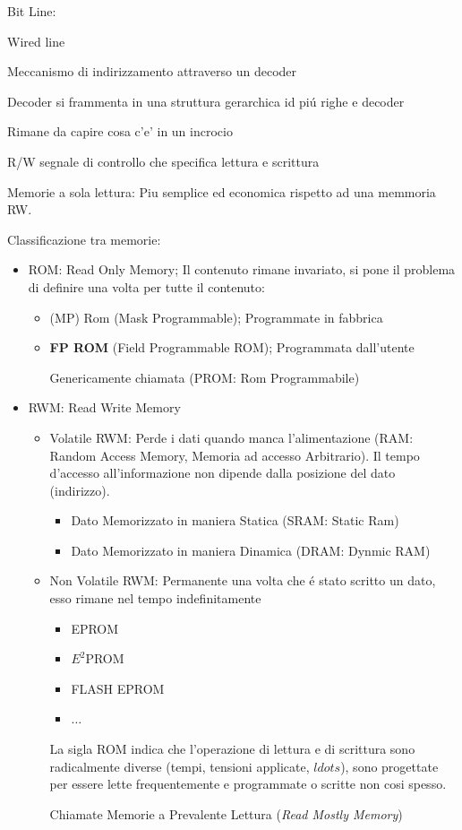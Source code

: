 \documentclass{article}
\begin{document}
Bit Line:

Wired line

Meccanismo di indirizzamento attraverso un decoder

Decoder si frammenta in una struttura gerarchica id pi\'u righe e decoder

Rimane da capire cosa c'e' in un incrocio

%

R/W segnale di controllo che specifica lettura e scrittura

Memorie a sola lettura: Piu semplice ed economica rispetto ad una memmoria RW.

Classificazione tra memorie:

\begin{itemize}
    \item ROM: Read Only Memory; Il contenuto rimane invariato, si pone il problema di definire una volta per tutte il contenuto:
        \begin{itemize}
            \item (MP) Rom (Mask Programmable); Programmate in fabbrica

            \item \textbf{FP ROM} (Field Programmable ROM); Programmata dall'utente

                Genericamente chiamata (PROM: Rom Programmabile)
        \end{itemize}
    \item RWM: Read Write Memory
        \begin{itemize}
            \item Volatile RWM: Perde i dati quando manca l'alimentazione (RAM: Random Access Memory, Memoria ad accesso Arbitrario). Il tempo d'accesso all'informazione non dipende dalla posizione del dato (indirizzo).
                \begin{itemize}
                    \item Dato Memorizzato in maniera Statica (SRAM: Static Ram)
                    \item Dato Memorizzato in maniera Dinamica (DRAM: Dynmic RAM)
                \end{itemize}
            \item Non Volatile RWM: Permanente una volta che \'e stato scritto un dato, esso rimane nel tempo indefinitamente
                \begin{itemize}
                    \item EPROM
                    \item $E^2$PROM
                    \item FLASH EPROM
                    \item $\ldots$
                \end{itemize}
                La sigla ROM indica che l'operazione di lettura e di scrittura sono radicalmente diverse (tempi, tensioni applicate, $ldots$), sono progettate per essere lette frequentemente e programmate o scritte non cosi spesso.

                Chiamate Memorie a Prevalente Lettura (\textit{Read Mostly Memory})
        \end{itemize}
\end{itemize}
\end{document}
